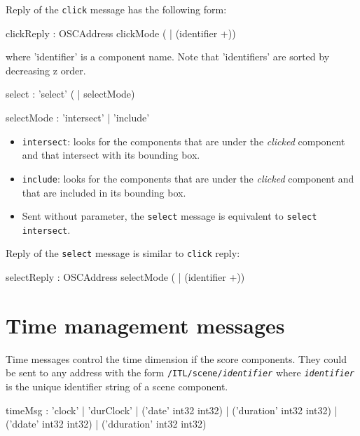 \documentclass[a4paper,twoside]{report}
\newcommand{\toplevel}[1]	{\chapter{#1}}
\newcommand{\OSC}[1]		{\texttt{#1}}
\begin{document}
Reply of the \OSC{click} message has the following form:
\begin{rail}
clickReply :	OSCAddress	clickMode ( | (identifier +))
\end{rail}

where 'identifier' is a component name. Note that 'identifiers' are sorted by decreasing z order.

\begin{rail}
select :	'select' ( 	| selectMode)
\end{rail}
 
\begin{rail}
selectMode :	'intersect' | 'include'
\end{rail}

\begin{itemize}
\item \OSC{intersect}: looks for the components that are under the \emph{clicked} component and that intersect with its bounding box.
\item \OSC{include}: looks for the components that are under the \emph{clicked} component and that are included in its bounding box.
\item Sent without parameter, the \OSC{select} message is equivalent to \OSC{select intersect}.
\end{itemize}

Reply of the \OSC{select} message is similar to \OSC{click} reply:
\begin{rail}
selectReply :	OSCAddress	selectMode ( | (identifier +))
\end{rail}


\toplevel{Time management messages}
\label{time}
Time messages control the time dimension if the score components. They could be sent to any address with the form \OSC{/ITL/scene/\textit{identifier}} where \OSC{\textit{identifier}} is the unique identifier string of a scene component.
\begin{rail}
timeMsg : 'clock'
		| 'durClock' 
		| ('date' int32 int32) 
		| ('duration' int32 int32) 
		| ('ddate' int32 int32) 
		| ('dduration' int32 int32) 
\end{rail}
\end{document}
